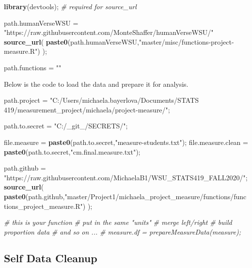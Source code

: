 \documentclass[]{article}
\newenvironment{Shaded}{\begin{snugshade}}{\end{snugshade}}
\newcommand{\CommentTok}[1]{\textcolor[rgb]{0.56,0.35,0.01}{\textit{#1}}}
\newcommand{\KeywordTok}[1]{\textcolor[rgb]{0.13,0.29,0.53}{\textbf{#1}}}
\newcommand{\NormalTok}[1]{#1}
\newcommand{\StringTok}[1]{\textcolor[rgb]{0.31,0.60,0.02}{#1}}
\begin{document}
\begin{Shaded}
\begin{Highlighting}[]
\KeywordTok{library}\NormalTok{(devtools);       }\CommentTok{\# required for source\_url}

\NormalTok{path.humanVerseWSU =}\StringTok{ "https://raw.githubusercontent.com/MonteShaffer/humanVerseWSU/"}
\KeywordTok{source\_url}\NormalTok{( }\KeywordTok{paste0}\NormalTok{(path.humanVerseWSU,}\StringTok{"master/misc/functions{-}project{-}measure.R"}\NormalTok{) );}

\NormalTok{path.functions =}\StringTok{ ""}
\end{Highlighting}
\end{Shaded}

Below is the code to load the data and prepare it for analysis.

\begin{Shaded}
\begin{Highlighting}[]
\NormalTok{path.project =}\StringTok{ "C:/Users/michaela.bayerlova/Documents/STATS 419/measurement\_project/michaela/project{-}measure/"}\NormalTok{;}

\NormalTok{path.to.secret =}\StringTok{ "C:/\_git\_/SECRETS/"}\NormalTok{;}

\NormalTok{file.measure =}\StringTok{ }\KeywordTok{paste0}\NormalTok{(path.to.secret,}\StringTok{"measure{-}students.txt"}\NormalTok{);}
\NormalTok{file.measure.clean =}\StringTok{ }\KeywordTok{paste0}\NormalTok{(path.to.secret,}\StringTok{"cm.final.measure.txt"}\NormalTok{);}

\NormalTok{path.github =}\StringTok{ "https://raw.githubusercontent.com/MichaelaB1/WSU\_STATS419\_FALL2020/"}\NormalTok{;}
\KeywordTok{source\_url}\NormalTok{( }\KeywordTok{paste0}\NormalTok{(path.github,}\StringTok{"master/Project1/michaela\_project\_measure/functions/functions\_project\_measure.R"}\NormalTok{) );}

\CommentTok{\# this is your function}
\CommentTok{\# put in the same "units"}
\CommentTok{\# merge left/right}
\CommentTok{\# build proportion data}
\CommentTok{\# and so on ... }
\CommentTok{\# measure.df = prepareMeasureData(measure);}
\end{Highlighting}
\end{Shaded}

\newpage

\subsection{Self Data Cleanup}
\label{sec:appendix-self-data-cleanup}
\end{document}
